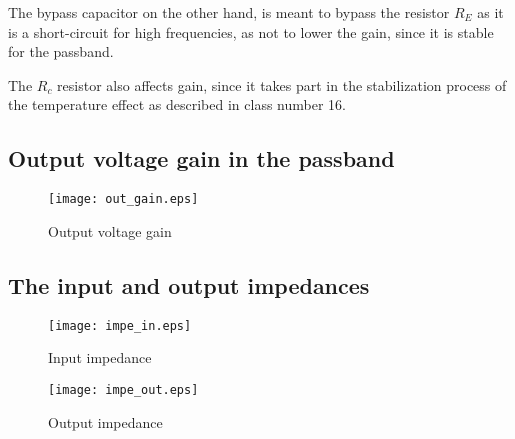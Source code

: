 The bypass capacitor on the other hand, is meant to bypass the resistor $R_E$ as it is a short-circuit for high frequencies, as not to lower the gain, since it is stable for the passband.

The $R_c$ resistor also affects gain, since it takes part in the stabilization process of the temperature effect as described in class number 16.

\subsection{Output voltage gain in the passband}
\begin{figure}[ht!] \centering
\texttt{[image: out\_gain.eps]}
\caption{Output voltage gain}
\label{fig:gain_sim}
\end{figure}


\subsection{The input and output impedances}

\begin{figure}[ht!] \centering
\texttt{[image: impe\_in.eps]}
\caption{Input impedance }
\label{fig:In_imp}
\end{figure}

\begin{figure}[ht!] \centering
\texttt{[image: impe\_out.eps]}
\caption{Output impedance }
\label{fig:out_imp}
\end{figure}




